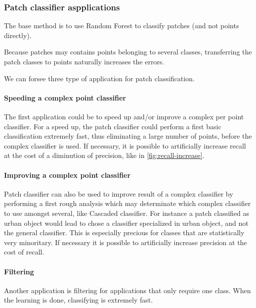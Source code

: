 	 
			
		\subsubsection{Patch classifier aspplications}
		
			The base method is to use Random Forest to classify patches (and not points directly).
			
			Because patches may contains points belonging to several classes, transferring the patch classes to points naturally increases the errors.
			
			We can forsee three type of application for patch classification.
			
			\paragraph{Speeding a complex point classifier}
				The first application could be to speed up and/or improve a complex per point classifier.
				For a speed up, the patch classifier could perform a first basic classification extremely fast, thus eliminating a large number of points, before the complex classifier is used. 
				If necessary, it is possible to artificially increase recall at the cost of a diminution of precision, like in \ref{fig:recall-increase}.
				 
				
			\paragraph{Improving a complex point classifier}
				Patch classifier can also be used to improve result of a complex classifier by performing a first rough analysis which may determinate which complex classifier to use amongst several, like Cascaded classifier.
				For instance a patch classified as urban object would lead to chose a classifier specialized in urban object, and not the general classifier. This is especially precious for classes that are statistically very minoritary.
				If necessary it is possible to artificially increase precision at the cost of recall.
				
				
				
			\paragraph{Filtering}
				Another application is filtering for applications that only require one class. When the learning is done, classifying is extremely fast.
				
